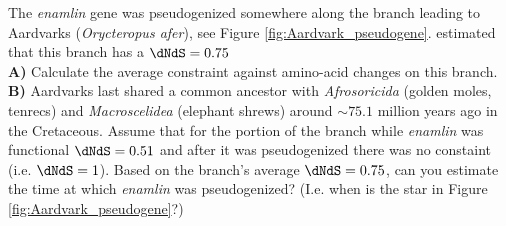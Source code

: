 \begin{question}{}
The {\it enamlin} gene was pseudogenized somewhere along the branch leading to
Aardvarks ({\it Orycteropus afer}), see Figure
\ref{fig:Aardvark_pseudogene}. \citet{Meredith:09} estimated that this
branch has a $\dNdS=0.75$\\
{\bf A)} Calculate the average constraint against amino-acid changes
on this branch.\\

{\bf B)} Aardvarks last shared a common ancestor
with {\it Afrosoricida} (golden moles, tenrecs) and {\it Macroscelidea} (elephant
shrews) around $\sim 75.1$ million years ago in the Cretaceous. Assume
that for the portion of the branch while
{\it enamlin} was functional $\dNdS = 0.51$  and
after it was pseudogenized there was no constaint (i.e. $\dNdS = 1$). Based on the branch's average $\dNdS=0.75$, can
you estimate the time at which {\it enamlin} was pseudogenized? (I.e. when
is the star in Figure \ref{fig:Aardvark_pseudogene}?)
\end{question}
